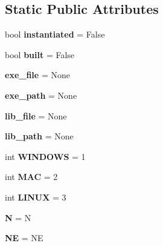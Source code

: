 \subsection*{Static Public Attributes}
\begin{DoxyCompactItemize}
\item 
\mbox{\label{classappjar_1_1gui_a482be9c8fcb8c21a1a8ed4c154896513}} 
bool {\bfseries instantiated} = False
\item 
\mbox{\label{classappjar_1_1gui_aa3e1e5a3bed1cb98e679e5137f3f8ec0}} 
bool {\bfseries built} = False
\item 
\mbox{\label{classappjar_1_1gui_a97d4a898b4edb065fdece8d93b4a84cc}} 
{\bfseries exe\+\_\+file} = None
\item 
\mbox{\label{classappjar_1_1gui_a0932bb6652f870ae6717612aca214770}} 
{\bfseries exe\+\_\+path} = None
\item 
\mbox{\label{classappjar_1_1gui_a98455070999dc9fab3b2ce17ab392fed}} 
{\bfseries lib\+\_\+file} = None
\item 
\mbox{\label{classappjar_1_1gui_ab6789a6d0ff694c21f81545c247038fa}} 
{\bfseries lib\+\_\+path} = None
\item 
\mbox{\label{classappjar_1_1gui_a17b58a869ee58143d0f15d2d0f9f2941}} 
int {\bfseries W\+I\+N\+D\+O\+WS} = 1
\item 
\mbox{\label{classappjar_1_1gui_adbaaf28934a91d6ee6555bc58871304b}} 
int {\bfseries M\+AC} = 2
\item 
\mbox{\label{classappjar_1_1gui_a595833aae63755fcb60b7a52af331a33}} 
int {\bfseries L\+I\+N\+UX} = 3
\item 
\mbox{\label{classappjar_1_1gui_afa8aa8e7eb3a4c1643dd6ab9ed97f2be}} 
{\bfseries N} = N
\item 
\mbox{\label{classappjar_1_1gui_ab269c88ec28823aa4a3a6956de5c5738}} 
{\bfseries NE} = NE

\end{DoxyCompactItemize}
